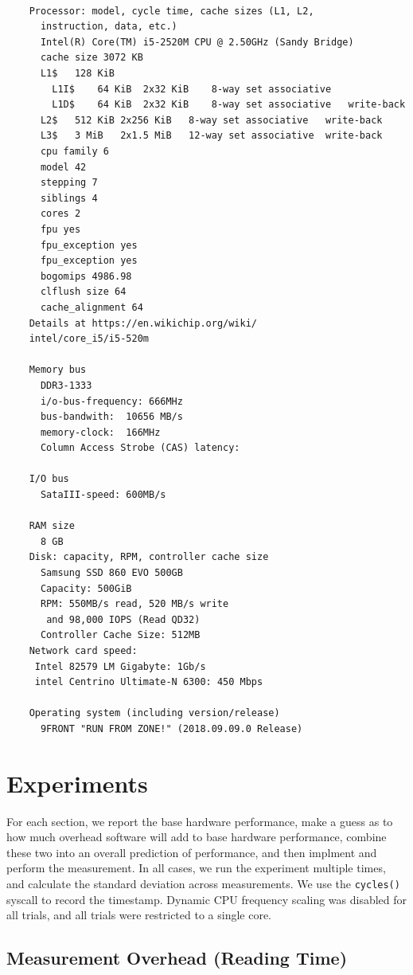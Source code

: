 \documentclass[letterpaper,twocolumn,10pt]{article}
\begin{document}
{\tt \small
\begin{verbatim}
    Processor: model, cycle time, cache sizes (L1, L2,
      instruction, data, etc.)
      Intel(R) Core(TM) i5-2520M CPU @ 2.50GHz (Sandy Bridge)
      cache size 3072 KB
      L1$	128 KiB	
        L1I$	64 KiB	2x32 KiB	8-way set associative	 
        L1D$	64 KiB	2x32 KiB	8-way set associative	write-back
      L2$	512 KiB 2x256 KiB	8-way set associative	write-back
      L3$	3 MiB   2x1.5 MiB	12-way set associative	write-back
      cpu family 6
      model 42
      stepping 7
      siblings 4
      cores 2
      fpu yes
      fpu_exception yes
      fpu_exception yes
      bogomips 4986.98
      clflush size 64
      cache_alignment 64
    Details at https://en.wikichip.org/wiki/
    intel/core_i5/i5-520m 

    Memory bus
      DDR3-1333
      i/o-bus-frequency: 666MHz
      bus-bandwith:  10656 MB/s
      memory-clock:  166MHz
      Column Access Strobe (CAS) latency:

    I/O bus
      SataIII-speed: 600MB/s

    RAM size
      8 GB
    Disk: capacity, RPM, controller cache size
      Samsung SSD 860 EVO 500GB
      Capacity: 500GiB
      RPM: 550MB/s read, 520 MB/s write
       and 98,000 IOPS (Read QD32)
      Controller Cache Size: 512MB 
    Network card speed:
     Intel 82579 LM Gigabyte: 1Gb/s
     intel Centrino Ultimate-N 6300: 450 Mbps
      
    Operating system (including version/release) 
      9FRONT "RUN FROM ZONE!" (2018.09.09.0 Release)
\end{verbatim}
}

\section{Experiments}

For each section, we report the base hardware performance, make a guess as to how much overhead software will add to base hardware performance, combine these two into an overall prediction of performance, and then implment and perform the measurement. In all cases, we run the experiment multiple times, and calculate the standard deviation across measurements. We use the \texttt{cycles()} syscall to record the timestamp. Dynamic CPU frequency scaling was disabled for all trials, and all trials were restricted to a single core.

\subsection{Measurement Overhead (Reading Time)}
\end{document}
